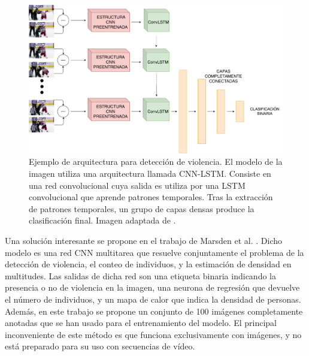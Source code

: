 \documentclass[../main.tex]{memoir}
\begin{document}
\begin{figure}[hbtp]
  \centering
  \includegraphics[width=.9\textwidth]{images/cnn_lstm_violence.pdf}
  \caption{Ejemplo de arquitectura para detección de violencia. El
    modelo de la imagen utiliza una arquitectura llamada
    CNN-LSTM. Consiste en una red convolucional cuya salida es utiliza
    por una LSTM convolucional que aprende patrones temporales. Tras
    la extracción de patrones temporales, un grupo de capas densas
    produce la clasificación final. Imagen adaptada de
    \cite{sudhakaran2017learning}.}
  \label{fig:cnn-lstm-violence}
\end{figure}

Una solución interesante se propone en el trabajo de Marsden et al.
\cite{marsden2017resnetcrowd}. Dicho modelo es una red CNN multitarea
que resuelve conjuntamente el problema de la detección de violencia,
el conteo de individuos, y la estimación de densidad en multitudes.
Las salidas de dicha red son una etiqueta binaria indicando la
presencia o no de violencia en la imagen, una neurona de regresión que
devuelve el número de individuos, y un mapa de calor que indica la
densidad de personas. Además, en este trabajo se propone un conjunto
de 100 imágenes completamente anotadas que se han usado para el
entrenamiento del modelo. El principal inconveniente de este método es
que funciona exclusivamente con imágenes, y no está preparado para su
uso con secuencias de vídeo.\\
\end{document}
